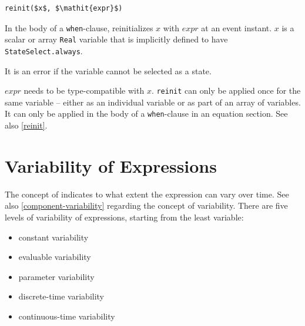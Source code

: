 \begin{operatordefinition}[reinit]
\begin{synopsis}\begin{lstlisting}
reinit($x$, $\mathit{expr}$)
\end{lstlisting}\end{synopsis}
\begin{semantics}
In the body of a \lstinline!when!-clause, reinitializes $x$ with $\mathit{expr}$ at an event instant.
$x$ is a scalar or array \lstinline!Real! variable that is implicitly defined to have \lstinline!StateSelect.always!.
\begin{nonnormative}
It is an error if the variable cannot be selected as a state.
\end{nonnormative}
$\mathit{expr}$ needs to be type-compatible with $x$.
\lstinline!reinit! can only be applied once for the same variable -- either as an individual variable or as part of an array of variables.
It can only be applied in the body of a \lstinline!when!-clause in an equation section.
See also \cref{reinit}.
\end{semantics}
\end{operatordefinition}

\section{Variability of Expressions}\label{variability-of-expressions}

The concept of  indicates to what extent the expression can vary over time.
See also \cref{component-variability} regarding the concept of variability.
There are five levels of variability of expressions, starting from the least variable:
\begin{itemize}
\item
  constant variability
\item
  evaluable variability
\item
  parameter variability
\item
  discrete-time variability
\item
  continuous-time variability
\end{itemize}

